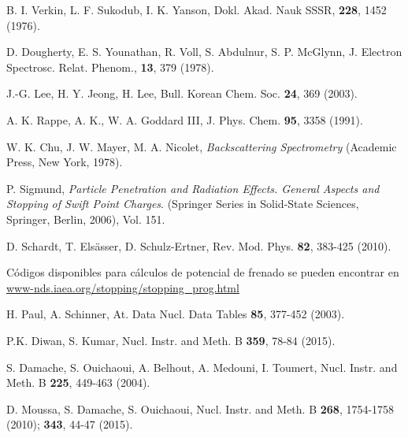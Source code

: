 \begin{thebibliography}{9}
B. I. Verkin, L. F. Sukodub, I. K. Yanson, 
Dokl. Akad. Nauk SSSR, \textbf{228}, 1452 (1976).

D. Dougherty, E. S. Younathan, R. Voll, S. Abdulnur, S. P. McGlynn,
J. Electron Spectrosc. Relat. Phenom., \textbf{13}, 379 (1978).

J.-G. Lee, H. Y. Jeong, H. Lee, 
Bull. Korean Chem. Soc. \textbf{24}, 369 (2003).

A. K. Rappe, A. K., W. A. Goddard III,
J. Phys. Chem. \textbf{95}, 3358 (1991).




W. K. Chu, J. W. Mayer, M. A. Nicolet,
\textit{Backscattering Spectrometry}
(Academic Press, New York, 1978).

P. Sigmund, 
\textit{Particle Penetration and Radiation Effects. General Aspects and 
Stopping of Swift Point Charges}.
(Springer Series in Solid-State Sciences, Springer, Berlin, 2006), Vol. 151.

D. Schardt, T. Els\"asser, D. Schulz-Ertner, 
Rev. Mod. Phys. \textbf{82},  383-425 (2010).

Códigos disponibles para cálculos de potencial de frenado se pueden 
encontrar en \href{https://www-nds.iaea.org/stopping/stopping\_prog.html}
{www-nds.iaea.org/stopping/stopping\_prog.html}

H. Paul, A. Schinner,
At. Data Nucl. Data Tables  \textbf{85}, 377-452 (2003).

P.K. Diwan, S. Kumar, 
Nucl. Instr. and Meth. B \textbf{359}, 78-84 (2015).

S. Damache, S. Ouichaoui, A. Belhout, A. Medouni, I. Toumert, 
Nucl. Instr. and Meth. B \textbf{225}, 449-463 (2004).

D. Moussa, S. Damache, S. Ouichaoui, 
Nucl. Instr. and Meth. B \textbf{268}, 1754-1758 (2010); 
\textbf{343},  44-47 (2015).


\end{thebibliography}
